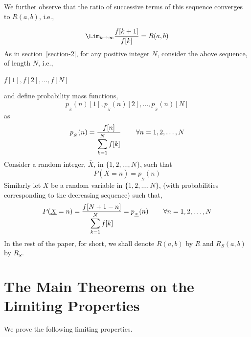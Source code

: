 \begin{multicols}{2}
\vspace{-.6cm}

We further observe that the ratio of successive terms of this sequence converges to $R(a,b)$, i.e.,

\vspace{-.3cm}

\begin{equation}
\Lim_{k \rightarrow \infty} \frac{f[k+1]}{f[k]} = R(a,b)\label{eq-3.5}
\end{equation}
As in section~\ref{section-2}, for any positive integer $N$, consider the above sequence, of length $N$, i.e.,
\begin{center}
$f[1],f[2], \ldots, f[N]$
\end{center} 

\vspace{-.3cm}

and define probability mass functions,
$$
p_{_{\bar{N}}}(n)[1],p_{_{\bar{N}}}(n)[2], \ldots, p_{_{\bar{N}}}(n)[N]
$$
as
\begin{equation}
 p_{_{\bar{N}}}(n) = \frac{f[n]}{\displaystyle{\sum_{k =1}^N f[k]}} \hspace{0.3in} \forall n = 1, 2, \ldots, N\label{eq-3.6}
\end{equation}
Consider a random integer, $\bar{X}$, in $\{1,2, \ldots, N\}$, such that
\begin{equation}
P(\bar{X} = n) = p_{_{\bar{N}}}(n)\label{eq-3.7}
\end{equation} 
Similarly let $\underline{X}$ be a random variable in $\{1,2, \ldots, N\}$, (with probabilities corresponding to the decreasing sequence) such that, 
\begin{equation}
P(\underline{X} = n) = \frac{f[N+1-n]}{\displaystyle{\sum_{k =1}^N f[k]}} = p_{_{\underline{N}}}(n) \hspace{0.3in} \forall n = 1, 2, \ldots, N\label{eq-3.8}
\end{equation} 
 In the rest of the paper, for short, we shall denote $R(a,b)$ by $R$ and $R_S(a,b)$ by $R_S$.
 
 \vspace{-.2cm}
 
\section{The Main Theorems on the\\ Limiting Properties}\label{section-4} 

We prove the following limiting properties.


\end{multicols}
